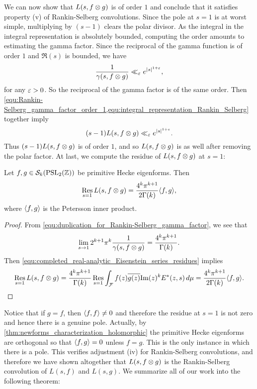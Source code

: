       We can now show that $L(s,f \otimes g)$ is of order $1$ and conclude that it satisfies property (v) of Rankin-Selberg convolutions. Since the pole at $s = 1$ is at worst simple, multiplying by $(s-1)$ clears the polar divisor. As the integral in the integral representation is absolutely bounded, computing the order amounts to estimating the gamma factor. Since the reciprocal of the gamma function is of order $1$ and $\Re(s)$ is bounded, we have
      \begin{equation}\label{equ:Rankin-Selberg_gamma_factor_order_1}
        \frac{1}{\gamma(s,f \otimes g)} \ll_{\varepsilon} e^{|s|^{1+\varepsilon}},
      \end{equation}
      for any $\varepsilon > 0$. So the reciprocal of the gamma factor is of the same order. Then \cref{equ:Rankin-Selberg_gamma_factor_order_1,equ:integral_representation_Rankin_Selberg} together imply
      \[
        (s-1)L(s,f \otimes g) \ll_{\varepsilon} e^{|s|^{1+\varepsilon}}.
      \]
      Thus $(s-1)L(s,f \otimes g)$ is of order $1$, and so $L(s,f \otimes g)$ is as well after removing the polar factor. At last, we compute the residue of $L(s,f \otimes g)$ at $s = 1$:
      \begin{proposition}
        Let $f,g \in \mathcal{S}_{k}(\mathrm{PSL}_{2}(\mathbb{Z}))$ be primitive Hecke eigenforms. Then
        \[
          \operatorname*{\mathrm{Res}}_{s = 1}L(s,f \otimes g) = \frac{4^{k}\pi^{k+1}}{2\Gamma(k)}\langle f,g\rangle,
        \]
        where $\langle f,g\rangle$ is the Petersson inner product.
      \end{proposition}
      \begin{proof}
        From \cref{equ:duplication_for_Rankin-Selberg_gamma_factor}, we see that
        \[
          \lim_{s \to 1}2^{k+1}\pi^{k}\frac{1}{\gamma(s,f \otimes g)} = \frac{4^{k}\pi^{k+1}}{\Gamma(k)}.
        \]
        Then \cref{equ:completed_real-analytic_Eisenstein_series_residues} implies
        \[
          \operatorname*{\mathrm{Res}}_{s = 1}L(s,f \otimes g) = \frac{4^{k}\pi^{k+1}}{\Gamma(k)}\operatorname*{\mathrm{Res}}_{s = 1}\int_{\mathcal{F}}f(z)\overline{g(z)}\mathrm{Im}(z)^{k}E^{\ast}(z,s)\,d\mu = \frac{4^{k}\pi^{k+1}}{2\Gamma(k)}\langle f,g\rangle.
        \]
      \end{proof}

      Notice that if $g = f$, then $\langle f,f\rangle \neq 0$ and therefore the residue at $s = 1$ is not zero and hence there is a genuine pole. Actually, by \cref{thm:newforms_characterization_holomorphic} the primitive Hecke eigenforms are orthogonal so that $\langle f,g\rangle = 0$ unless $f = g$. This is the only instance in which there is a pole. This verifies adjustment (iv) for Rankin-Selberg convolutions, and therefore we have shown altogether that $L(s,f \otimes g)$ is the Rankin-Selberg convolution of $L(s,f)$ and $L(s,g)$. We summarize all of our work into the following theorem:

